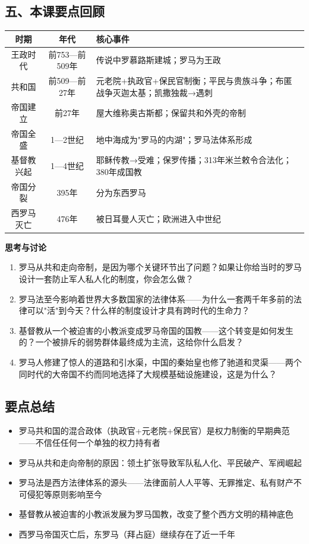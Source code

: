 \documentclass[a4paper,12pt]{ctexart}
\begin{document}
\subsection*{五、本课要点回顾}

\begin{center}
\begin{tabular}{|c|c|p{7cm}|}
\hline
\textbf{时期} & \textbf{年代} & \textbf{核心事件} \\
\hline
王政时代 & 前753—前509年 & 传说中罗慕路斯建城；罗马为王政 \\
\hline
共和国 & 前509—前27年 & 元老院+执政官+保民官制衡；平民与贵族斗争；布匿战争灭迦太基；凯撒独裁→遇刺 \\
\hline
帝国建立 & 前27年 & 屋大维称奥古斯都；保留共和外壳的帝制 \\
\hline
帝国全盛 & 1—2世纪 & 地中海成为"罗马的内湖"；罗马法体系形成 \\
\hline
基督教兴起 & 1—4世纪 & 耶稣传教→受难；保罗传播；313年米兰敕令合法化；380年成国教 \\
\hline
帝国分裂 & 395年 & 分为东西罗马 \\
\hline
西罗马灭亡 & 476年 & 被日耳曼人灭亡；欧洲进入中世纪 \\
\hline
\end{tabular}
\end{center}

\vspace{0.3cm}
{\large\textcolor{orange!80!black}{\textbf{思考与讨论}}}
\begin{enumerate}
  \item 罗马从共和走向帝制，是因为哪个关键环节出了问题？如果让你给当时的罗马设计一套防止军人私人化的制度，你会怎么做？
  \item 罗马法至今影响着世界大多数国家的法律体系——为什么一套两千年多前的法律可以"活"到今天？什么样的制度设计才具有跨时代的生命力？
  \item 基督教从一个被迫害的小教派变成罗马帝国的国教——这个转变是如何发生的？一个被排斥的弱势群体最终成为主流，这给你什么启发？
  \item 罗马人修建了惊人的道路和引水渠，中国的秦始皇也修了驰道和灵渠——两个同时代的大帝国不约而同地选择了大规模基础设施建设，这是为什么？
\end{enumerate}

\subsection*{要点总结}
\begin{itemize}
  \item 罗马共和国的混合政体（执政官+元老院+保民官）是权力制衡的早期典范——不信任任何一个单独的权力持有者
  \item 罗马从共和走向帝制的原因：领土扩张导致军队私人化、平民破产、军阀崛起
  \item 罗马法是西方法律体系的源头——法律面前人人平等、无罪推定、私有财产不可侵犯等原则影响至今
  \item 基督教从被迫害的小教派发展为罗马国教，改变了整个西方文明的精神底色
  \item 西罗马帝国灭亡后，东罗马（拜占庭）继续存在了近一千年
\end{itemize}
\end{document}
